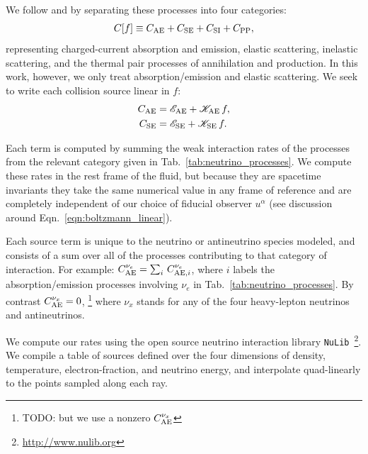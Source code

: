 \documentclass[aps,floatfix,prd,superscriptaddress,twocolumn]{revtex4-1}
\begin{document}
We follow
\cite{brue1985-core_collapse} and \cite[Sec.~4]{shib2011-truncated_moment}
by separating these processes into four categories:
\begin{equation}
  \label{eqn:four_sources}
  C[f] \equiv C_{\rm AE} + C_{\rm SE} + C_{\rm SI} + C_{\rm PP},
\end{equation}
representing charged-current absorption and emission, elastic scattering,
inelastic scattering, and the thermal pair processes of annihilation and
production. In this work, however, we only treat absorption/emission
and elastic scattering.
We seek to write each collision source linear in $f$:
\begin{align}
  \label{eqn:sources_cae}
  C_{\rm AE}
  &= \mathscr{E}_{\rm AE} + \mathscr{K}_{\rm AE}\, f, \\
  \label{eqn:sources_cse}
  C_{\rm SE}
  &= \mathscr{E}_{\rm SE} + \mathscr{K}_{\rm SE}\, f.
\end{align}

Each term
is computed by summing the weak interaction rates of the processes from the
relevant category given in Tab.~\ref{tab:neutrino_processes}.
We compute these rates in the rest frame of the fluid,
but because they are spacetime invariants
they take the same numerical value in any frame of reference
and are completely independent of our choice of fiducial observer $u^\alpha$
(see discussion around Eqn.~\ref{eqn:boltzmann_linear}).

Each source term is unique to the neutrino or antineutrino species modeled,
and consists of a sum over all of the processes contributing to that
category of interaction. For example:
$C^{\nu_e}_{{\rm AE}} = \sum_i\,C^{\nu_e}_{{\rm AE},i}$,
where $i$ labels the absorption/emission processes involving $\nu_e$
in Tab.~\ref{tab:neutrino_processes}.
By contrast $C^{\nu_x}_{{\rm AE}} = 0$,
\footnote{TODO: but we use a nonzero $C^{\nu_x}_{{\rm AE}}$}
where $\nu_x$ stands for any of the four heavy-lepton neutrinos and
antineutrinos.

We compute our rates using the open source neutrino interaction
library \lstinline{NuLib}~\footnote{\url{http://www.nulib.org}}.
We compile a table of sources defined over the four dimensions of
density, temperature, electron-fraction, and neutrino energy, and
interpolate quad-linearly to the points sampled along each ray.
\end{document}
